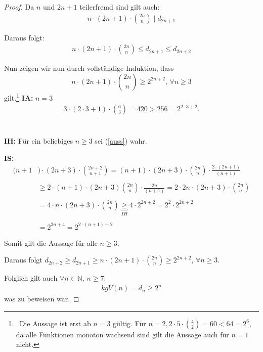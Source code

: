 \documentclass[12pt,oneside]{article}
\theoremstyle{remark}
\theoremstyle{definition}
\begin{document}
\begin{proof}
Da $n $ und $2n + 1$ teilerfremd sind gilt auch:
\begin{align*}
    n \cdot (2n + 1) \cdot {2n \choose n} \mid d_{2n + 1}
\end{align*}

Daraus folgt:
\begin{align*}
    n \cdot (2n + 1) \cdot {2n \choose n} \leq d_{2n + 1} \leq d_{2n + 2}
\end{align*}

Nun zeigen wir nun durch vollständige Induktion, dass 
\begin{equation}\label{auss}
    n \cdot (2n + 1) \cdot {2n \choose n} \geq 2^{2n + 2}, \, \forall n \geq 3
\end{equation}
gilt.\footnote{$\,$ Die Aussage ist erst ab $n = 3$ gültig. Für $n = 2, 2 \cdot 5 \cdot {4 \choose 2} = 60 < 64 = 2^{6} $, da alle Funktionen monoton wachsend sind gilt die Aussage auch für $n = 1$ nicht.}\newline\newline
\textbf{IA:} $n = 3$
\begin{align*}
    3 \cdot (2 \cdot 3 + 1) \cdot { 6 \choose 3} = 420 > 256 = 2^{2 \cdot 3 + 2}.
\end{align*}
\\
\\
\textbf{IH:} Für ein beliebiges $n \geq 3$ sei (\ref{auss}) wahr.\newline\newline

\textbf{IS:}
\begin{align*}
    (n + 1&) \cdot (2n + 3) \cdot {2n + 2 \choose n + 1} =(n + 1) \cdot (2n + 3) \cdot {2n \choose n} \cdot \frac{2 \cdot (2n + 1)}{(n + 1)} \\
    \\
    &\geq 2 \cdot (n + 1) \cdot (2n + 3) {2n \choose n} \cdot \frac{2n}{(n + 1)} = 2 \cdot 2n \cdot (2n + 3) \cdot {2n \choose n} \\
    \\ 
    &= 4 \cdot n \cdot (2n + 3) \cdot {2n \choose n} \underbrace{\geq}_{IH} 4 \cdot 2^{2n + 2} = 2^2 \cdot 2^{2n + 2}\\
    \\
    &= 2^{2n + 4} = 2^{2 \cdot (n + 1) + 2} 
\end{align*}

Somit gilt die Aussage für alle $n \geq 3$.\newline\newline 

Daraus folgt $d_{2n + 2} \geq d_{2n + 1} \geq  n \cdot (2n + 1) \cdot {2n \choose n} \geq 2^{2n + 2}, \, \forall n \geq 3$.\newline\newline

Folglich gilt auch $\forall n \in \mathbb{N}, \, n \geq 7$:
\begin{align*}
    kgV(n)= d_{n} \geq 2^{n}
\end{align*}
was zu beweisen war.
\end{proof}
\end{document}
